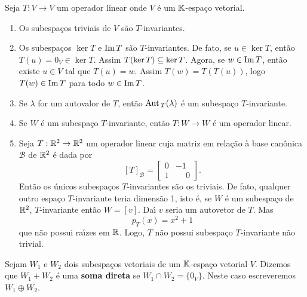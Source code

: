 \begin{exemplo}
Seja $T : V \to V$ um operador linear onde $V$ \'e um $\mathbb{K}$-espa\c{c}o vetorial.
	\begin{enumerate}
		\item Os subespa\c{c}os triviais de $V$ s\~ao $T$-invariantes.
		\item Os subespa\c{c}os $\ker T$ e ${\rm Im\,} T$ s\~ao $T$-invariantes. De fato, se $u \in \ker T$, ent\~ao $T(u) = 0_V \in \ker T$. Assim $T(\ker T) \subseteq \ker T$. Agora, se $w \in {\rm Im\,} T$, ent\~ao existe $u \in V$ tal que $T(u) = w$. Assim $T(w) = T(T(u))$, logo $T(w) \in {\rm Im\,} T$ para todo $w \in {\rm Im\,} T$.
		\item Se $\lambda$ for um autovalor de $T$, ent\~ao ${\rm Aut\,}_T(\lambda)$ \'e um subespa\c{c}o $T$-invariante.
		\item Se $W$ \'e um subespa\c{c}o $T$-invariante, ent\~ao $T : W \to W$ \'e um operador linear.
		\item Seja $T : \mathbb{R}^2 \to \mathbb{R}^2$ um operador linear cuja matriz em rela\c{c}\~ao \`a base can\^onica $\mathcal{B}$ de $\mathbb{R}^2$ \'e dada por
		\[
			[T]_\mathcal{B} = \begin{bmatrix}
				0 & -1\\
				1 & \phantom{-}0
			\end{bmatrix}.
		\]
		Ent\~ao os \'unicos subespa\c{c}os $T$-invariantes s\~ao os triviais. De fato, qualquer outro espa\c{c}o $T$-invariante teria dimens\~ao 1, isto \'e, se $W$ \'e um subespa\c{c}o de $\mathbb{R}^2$, $T$-invariante ent\~ao $W = [v]$. Da{\'\i} $v$ seria um autovetor de $T$. Mas
		\[
			p_T(x) = x^2 + 1
		\]
		que n\~ao possui ra{\'\i}zes em $\mathbb{R}$. Logo, $T$ n\~ao possui subespa\c{c}o $T$-invariante n\~ao trivial.
	\end{enumerate}
\end{exemplo}

\begin{definicao}
	Sejam $W_1$ e $W_2$ dois subespa\c{c}os vetoriais de um $\mathbb{K}$-espa\c{c}o vetorial $V$. Dizemos que $W_1 + W_2$ \'e uma \textbf{soma direta} se $W_1 \cap W_2 = \{0_V\}$. Neste caso escreveremos $W_1 \oplus W_2$.
\end{definicao}

